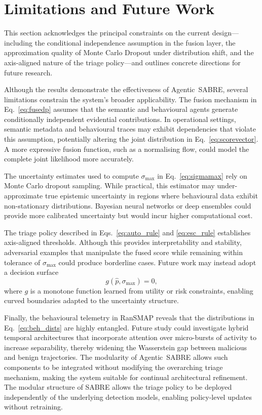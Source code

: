 \documentclass[lettersize,journal]{IEEEtran}
\begin{document}
\section{Limitations and Future Work}
\label{sec:limitations}


\cbstart
This section acknowledges the principal constraints on the current design---including the
conditional independence assumption in the fusion layer, the approximation quality of Monte
Carlo Dropout under distribution shift, and the axis-aligned nature of the triage
policy---and outlines concrete directions for future research.
\cbend


Although the results demonstrate the effectiveness of Agentic~SABRE, several limitations constrain the system’s broader applicability. The fusion mechanism in Eq.~\eqref{eq:fusedp} assumes that the semantic and behavioural agents generate conditionally independent evidential contributions. In operational settings, semantic metadata and behavioural traces may exhibit dependencies that violate this assumption, potentially altering the joint distribution in Eq.~\eqref{eq:scorevector}. A more expressive fusion function, such as a normalising flow, could model the complete joint likelihood more accurately.

The uncertainty estimates used to compute \(\sigma_{\max}\) in Eq.~\eqref{eq:sigmamax} rely on Monte Carlo dropout sampling. While practical, this estimator may under-approximate true epistemic uncertainty in regions where behavioural data exhibit non-stationary distributions. Bayesian neural networks or deep ensembles could provide more calibrated uncertainty but would incur higher computational cost.

The triage policy described in Eqs.~\eqref{eq:auto_rule} and \eqref{eq:esc_rule} establishes axis-aligned thresholds. Although this provides interpretability and stability, adversarial examples that manipulate the fused score while remaining within tolerance of \(\sigma_{\max}\) could produce borderline cases. Future work may instead adopt a decision surface
\begin{equation}
g(\hat{p},\sigma_{\max}) = 0,
\label{eq:nonlinear_boundary}
\end{equation}
where \(g\) is a monotone function learned from utility or risk constraints, enabling curved boundaries adapted to the uncertainty structure.

Finally, the behavioural telemetry in RanSMAP reveals that the distributions in Eq.~\eqref{eq:beh_dists} are highly entangled. Future study could investigate hybrid temporal architectures that incorporate attention over micro-bursts of activity to increase separability, thereby widening the Wasserstein gap between malicious and benign trajectories. The modularity of Agentic~SABRE allows such components to be integrated without modifying the overarching triage mechanism, making the system suitable for continual architectural refinement.
The modular structure of SABRE allows the triage policy to be deployed independently of the underlying detection models, enabling policy-level updates without retraining.
\end{document}
